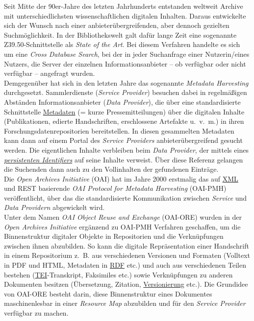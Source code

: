 \documentclass{article}
\begin{document}
    Seit Mitte der 90er-Jahre des letzten Jahrhunderts entstanden weltweit Archive mit unterschiedlichsten wissenschaftlichen digitalen Inhalten. Daraus entwickelte sich der Wunsch nach einer anbieterübergreifenden, aber dennoch gezielten Suchmöglichkeit. In der Bibliothekswelt galt dafür lange Zeit eine sogenannte Z39.50-Schnittstelle als \emph{State of the Art}. Bei diesem Verfahren handelte es sich um eine \emph{Cross Database Search}, bei der in jeder Suchanfrage einer Nutzerin/eines Nutzers, die Server der einzelnen Informationsanbieter – ob verfügbar oder nicht verfügbar – angefragt wurden. \\
            
        Demgegenüber hat sich in den letzten Jahre das sogenannte \emph{Metadata Harvesting} durchgesetzt. Sammlerdienste (\emph{Service Provider}) besuchen dabei in regelmäßigen Abständen Informationsanbieter (\emph{Data Provider}), die über eine standardisierte Schnittstelle \href{http://gams.uni-graz.at/o:konde.225}{Metadaten} (= kurze Pressemitteilungen) über die digitalen Inhalte (Publikationen, edierte Handschriften, erschlossene Artefakte u. v. m.) in ihren Forschungsdatenrepositorien bereitstellen. In diesen gesammelten Metadaten kann dann auf einem Portal des \emph{Service Providers} anbieterübergreifend gesucht werden. Die eigentlichen Inhalte verbleiben beim \emph{Data Provider}, der mittels eines \emph{\href{http://gams.uni-graz.at/o:konde.12}{persistenten Identifiers}} auf seine Inhalte verweist. Über diese Referenz gelangen die Suchenden dann auch zu den Vollinhalten der gefundenen Einträge. \\
            
        Die \emph{Open Archives Initiative} (OAI) hat im Jahre 2000 erstmalig das auf \href{http://gams.uni-graz.at/o:konde.215}{XML} und REST basierende \emph{OAI Protocol for Metadata Harvesting} (OAI-PMH) veröffentlicht, über das die standardisierte Kommunikation zwischen \emph{Service} und \emph{Data Providern} abgewickelt wird.\\
            
        Unter dem Namen \emph{OAI Object Reuse and Exchange} (OAI-ORE) wurden in der \emph{Open Archives Initiative} ergänzend zu OAI-PMH Verfahren geschaffen, um die Binnenstruktur digitaler Objekte in Repositorien und die Verknüpfungen zwischen ihnen abzubilden. So kann die digitale Repräsentation einer Handschrift in einem Repositorium z. B. aus verschiedenen Versionen und Formaten (Volltext in PDF und HTML, Metadaten in  \href{http://gams.uni-graz.at/o:konde.131}{RDF} etc.) und auch aus verschiedenen Teilen bestehen (\href{http://gams.uni-graz.at/o:konde.178}{TEI}-Transkript, Faksimiles etc.) sowie Verknüpfungen zu anderen Dokumenten besitzen (Übersetzung, Zitation, \href{http://gams.uni-graz.at/o:konde.14}{Versionierung} etc.). Die Grundidee von OAI-ORE besteht darin, diese Binnenstruktur eines Dokumentes maschinenlesbar in einer \emph{Resource Map} abzubilden und für den \emph{Service Provider} verfügbar zu machen. 		\\
            
\end{document}
